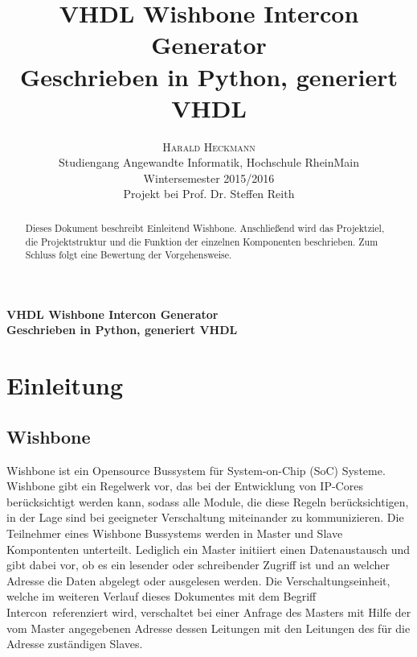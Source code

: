 \documentclass{article}
\title{\vspace{-3mm}%
	\fontsize{24pt}{10pt}\selectfont
	\textbf{VHDL Wishbone Intercon Generator} \\
	\textbf{Geschrieben in Python, generiert VHDL}
	}
\author{%
	\large
	\textsc{Harald Heckmann} \\[2mm]
	\normalsize	Studiengang Angewandte Informatik, Hochschule RheinMain \\
	\normalsize	Wintersemester 2015/2016 \\
	\normalsize	Projekt bei Prof. Dr. Steffen Reith \\
	\vspace{-5mm}
	}
\date{}
\begin{document}

\maketitle
\newpage




\begin{center}
\textbf{VHDL Wishbone Intercon Generator} \\
\textbf{Geschrieben in Python, generiert VHDL}
\end{center}

\begin{abstract}
Dieses Dokument beschreibt Einleitend Wishbone. Anschließend wird das Projektziel, die Projektstruktur und die Funktion der einzelnen Komponenten beschrieben. Zum Schluss folgt eine Bewertung der Vorgehensweise.
\end{abstract}
\newpage
\tableofcontents
\newpage


\section{Einleitung}
\subsection{Wishbone}
Wishbone ist ein Opensource Bussystem für System-on-Chip (SoC) Systeme.
Wishbone gibt ein Regelwerk vor, das bei der Entwicklung von IP-Cores
berücksichtigt werden kann, sodass alle Module, die diese Regeln berücksichtigen,
in der Lage sind bei geeigneter Verschaltung miteinander zu kommunizieren.
Die Teilnehmer eines Wishbone Bussystems werden in Master und Slave Kompontenten
unterteilt. Lediglich ein Master initiiert einen Datenaustausch und 
gibt dabei vor, ob es ein lesender oder schreibender Zugriff ist und an welcher Adresse
die Daten abgelegt oder ausgelesen werden. %
Die Verschaltungseinheit, welche im weiteren Verlauf dieses Dokumentes mit dem Begriff \glqq Intercon\grqq\ referenziert wird, verschaltet bei einer Anfrage des Masters mit Hilfe der vom Master angegebenen Adresse 
dessen Leitungen mit den Leitungen des für die Adresse zuständigen Slaves.
\end{document}
